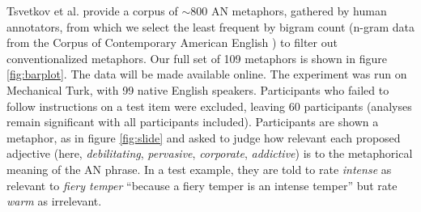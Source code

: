 \documentclass[9pt,twocolumn,twoside,lineno]{pnas-new}
\begin{document}
{		
Tsvetkov et al. \cite{tsvetkov2014metaphor} provide a corpus of $\sim$800 AN metaphors, gathered by human annotators, from which we select the least frequent by bigram count (n-gram data from the Corpus of Contemporary American English \cite{davies2011word}) to filter out conventionalized metaphors. Our full set of 109 metaphors is shown in figure \ref{fig:barplot}. The data will be made available online. 
The experiment was run on Mechanical Turk, with 99 native English speakers. Participants who failed to follow instructions on a test item were excluded, leaving 60 participants (analyses remain significant with all participants included).
Participants are shown a metaphor, as in figure \ref{fig:slide} and asked to judge how relevant each proposed adjective (here, \emph{debilitating}, \emph{pervasive}, \emph{corporate}, \emph{addictive}) is to the metaphorical meaning of the AN phrase. In a test example, they are told to rate \emph{intense} as relevant to \emph{fiery temper} ``because a fiery temper is an intense temper'' but rate \emph{warm} as irrelevant.

}

\showmatmethods{} %




\end{document}
